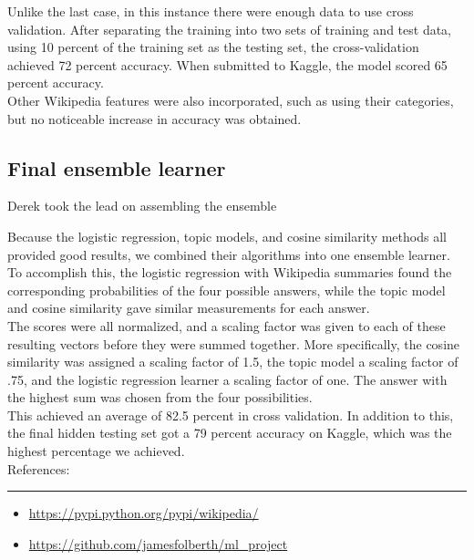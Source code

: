 \documentclass{article}
\newcommand{\problemline}{\rule{\textwidth}{0.25mm}}
\theoremstyle{mystuff}
\theoremstyle{myexample}
\theoremstyle{named}
\begin{document}
Unlike the last case, in this instance there were enough data to use cross validation.  After separating the training into two sets of training and test data, using 10 percent of the training set as the testing set, the cross-validation achieved 72 percent accuracy.  When submitted to Kaggle, the model scored 65 percent accuracy.\\

Other Wikipedia features were also incorporated, such as using their categories, but no noticeable increase in accuracy was obtained.\\
\label{ssec:log_reg}

\subsection{Final ensemble learner}
Derek took the lead on assembling the ensemble

Because the logistic regression, topic models, and cosine similarity methods all provided good results, we combined their algorithms into one ensemble learner.  To accomplish this, the logistic regression with Wikipedia summaries found the corresponding probabilities of the four possible answers, while the topic model and cosine similarity gave similar measurements for each answer. \\

The scores were all normalized, and a scaling factor was given to each of these resulting vectors before they were summed together. More specifically, the cosine similarity was assigned a scaling factor of 1.5, the topic model a scaling factor of .75, and the logistic regression learner a scaling factor of one.  The answer with the highest sum was chosen from the four possibilities. \\

This achieved an average of 82.5 percent in cross validation.  In addition to this, the final hidden testing set got a 79 percent accuracy on Kaggle, which was the highest percentage we achieved. \\



References:\\
\problemline
\begin{itemize}
   \item \url{https://pypi.python.org/pypi/wikipedia/}
   \item \url{https://github.com/jamesfolberth/ml_project}
\end{itemize}

%
%
\end{document}
